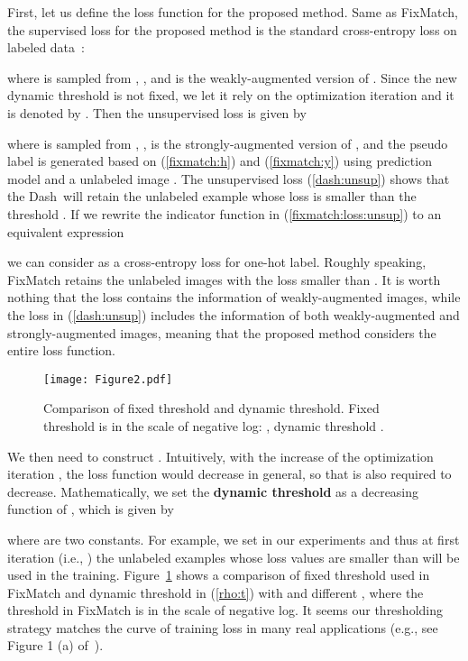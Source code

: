 \documentclass{article}
\def \Alg {Dash}
\begin{document}
First, let us define the loss function for the proposed method. Same as FixMatch, the supervised loss  for the proposed method is the standard cross-entropy loss on labeled data~: 

where  is sampled from , , and  is the weakly-augmented version of . 
Since the new dynamic threshold is not fixed, we let it rely on the optimization iteration  and it is denoted by . Then the unsupervised loss is given by

where  is sampled from ,  ,  is the strongly-augmented version of , and the pseudo label  is generated based on (\ref{fixmatch:h}) and (\ref{fixmatch:y}) using prediction model  and a unlabeled image . The unsupervised loss (\ref{dash:unsup}) shows that the \Alg~will retain the unlabeled example whose loss is smaller than the threshold .
If we rewrite the indicator function  in (\ref{fixmatch:loss:unsup}) to an equivalent expression

we can consider  as a cross-entropy loss for one-hot label. Roughly speaking, FixMatch retains the unlabeled images with the loss  smaller than . It is worth nothing that the loss  contains the information of weakly-augmented images, while the loss  in (\ref{dash:unsup}) includes the information of both  weakly-augmented and strongly-augmented images, meaning that the proposed method considers the entire loss function.



\begin{figure}[t]
    \centering
    \texttt{[image: Figure2.pdf]}
    \caption{Comparison of fixed threshold and dynamic threshold. Fixed threshold is in the scale of negative log: , dynamic threshold .}\label{fig:threshold}
\end{figure}
We then need to construct . Intuitively, with the increase of the optimization iteration , the loss function would decrease in general, so that  is also required to decrease. Mathematically, we set the {\bf dynamic threshold}  as a decreasing function of , which is given by

where  are two constants. For example, we set  in our experiments and thus at first iteration (i.e., ) the unlabeled examples whose loss values are smaller than  will be used in the training. Figure~\ref{fig:threshold} shows a comparison of fixed threshold used in FixMatch and dynamic threshold  in (\ref{rho:t}) with  and different , where the threshold in FixMatch is in the scale of negative log. It seems our thresholding strategy matches the curve of training loss in many real applications (e.g., see Figure 1 (a) of~\citep{zhang2016understanding}). 
\end{document}
